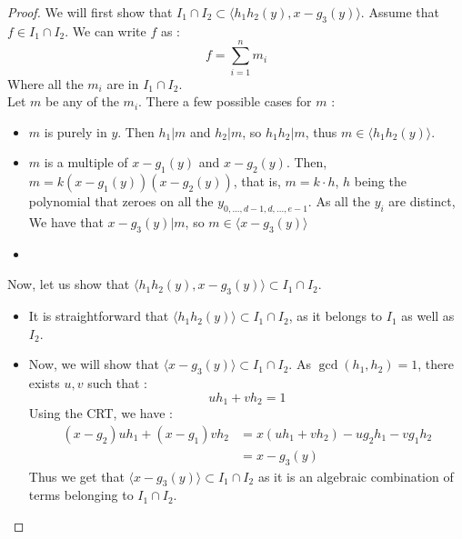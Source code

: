 \documentclass{article}
\begin{document}
\begin{proof}
    We will first show that $I_{1} \cap I_{2} \subset \langle h_{1}h_{2}(y), x - g_{3}(y) \rangle$.
    Assume that $f \in I_{1} \cap I_{2}$. We can write $f$ as : 
    \begin{displaymath}
        f = \sum_{i = 1}^{n} m_{i}
    \end{displaymath}
    Where all the $m_{i}$ are in $I_{1} \cap I_{2}$. \\
    Let $m$ be any of the $m_{i}$. There a few possible cases for $m$ : 
    \begin{itemize}
        \item $m$ is purely in $y$. Then $h_{1} | m$ and $h_{2} | m$, so $h_{1}h_{2} | m$, thus $m \in \langle h_{1}h_{2}(y) \rangle$.
        \item $m$ is a multiple of $x - g_{1}(y)$ and $x - g_{2}(y)$. Then, $m = k(x - g_{1}(y))(x - g_{2}(y))$, that is, $m = k \cdot h$, $h$ being the polynomial that zeroes on all the $y_{0,...,d-1,d,...,e-1}$. As all the $y_{i}$ are distinct, We have that $x - g_{3}(y) | m$, so $m \in \langle x - g_{3}(y) \rangle $
        \item 
    \end{itemize}
    
    Now, let us show that $\langle h_{1}h_{2}(y), x - g_{3}(y) \rangle \subset I_{1} \cap I_{2}$.
    \begin{itemize}
        \item It is straightforward that $\langle h_{1}h_{2}(y) \rangle \subset I_{1} \cap I_{2}$, as it belongs to $I_{1}$ as well as $I_{2}$.
        \item Now, we will show that  $\langle x - g_{3}(y) \rangle \subset I_{1} \cap I_{2}$. As $\gcd(h_{1}, h_{2}) = 1$, there exists $u, v$ such that : 
        \begin{displaymath}
            uh_{1} + vh_{2} = 1
        \end{displaymath}
        Using the CRT, we have : 
        \begin{align*}
            (x - g_{2})uh_{1} + (x - g_{1})vh_{2} 
            & = x(uh_{1} + vh_{2}) - ug_{2}h_{1} - vg_{1}h_{2} \\
            & = x - g_{3}(y)
        \end{align*}
        Thus we get that $\langle x - g_{3}(y) \rangle \subset I_{1} \cap I_{2}$ as it is an algebraic combination of terms belonging to $I_{1} \cap I_{2}$.

    \end{itemize}

\end{proof}
\end{document}
